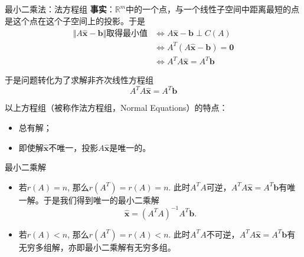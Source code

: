 
\begin{frame}

\begin{block}{最小二乘法：法方程组}
{\bfseries 事实}：$\mathbb{R}^m$中的一个点，与一个线性子空间中距离最短的点是这个点在这个子空间上的投影。于是
\begin{align*}
\Vert A\widehat{\mathbf{x}} - \mathbf{b} \Vert \text{取得最小值} & \Longleftrightarrow A\widehat{\mathbf{x}} - \mathbf{b} \perp C(A) \\
& \Longleftrightarrow A^T (A\widehat{\mathbf{x}} - \mathbf{b}) = \mathbf{0} \\
& \Longleftrightarrow A^TA\widehat{\mathbf{x}} = A^T\mathbf{b}
\end{align*}

于是问题转化为了求解非齐次线性方程组
$$A^TA\widehat{\mathbf{x}} = A^T\mathbf{b}$$

\vspace{1em}
\pause

以上方程组（被称作法方程组，Normal Equations）的特点：
\begin{itemize}
\item 总有解；
\item 即使解$\widehat{\mathbf{x}}$不唯一，投影$A\widehat{\mathbf{x}}$是唯一的。
\end{itemize}
\end{block}

\end{frame}


\begin{frame}

\begin{block}{最小二乘解}
\begin{itemize}
\item<1-> 若$r(A) = n$, 那么$r(A^T) = r(A) = n$. 此时$A^TA$可逆，$A^TA\widehat{\mathbf{x}} = A^T\mathbf{b}$有唯一解。于是我们得到唯一的最小二乘解
$$\widehat{\mathbf{x}} = (A^TA)^{-1}A^T\mathbf{b}.$$
\item<2-> 若$r(A) < n$, 那么$r(A^T) = r(A) < n$. 此时$A^TA$不可逆，$A^TA\widehat{\mathbf{x}} = A^T\mathbf{b}$有无穷多组解，亦即最小二乘解有无穷多组。
\end{itemize}
\end{block}

\end{frame}

